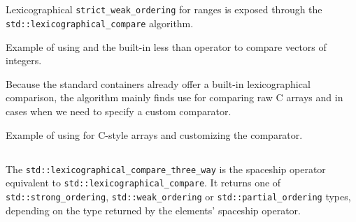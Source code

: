 \subsection{\texorpdfstring{}{\texttt{std::lexicographical\_compare}}}

Lexicographical \texttt{strict\_weak\_ordering} for ranges is exposed through the \texttt{std::lexicographical\_compare} algorithm.



\begin{box-note}
\footnotesize Example of using  and the built-in less than operator to compare vectors of integers.
\tcblower
{}
\end{box-note}

Because the standard containers already offer a built-in lexicographical comparison, the algorithm mainly finds use for comparing raw C arrays and in cases when we need to specify a custom comparator.

\begin{box-note}
\footnotesize Example of using  for C-style arrays and customizing the comparator.
\tcblower
{}
\end{box-note}

\subsection{\texorpdfstring{}{\texttt{std::lexicographical\_compare\_three\_way}}}

The \texttt{std::lexicographical\_compare\_three\_way} is the spaceship operator equivalent to \texttt{std::lexicographical\_compare}. It returns one of \texttt{std::strong\_ordering}, \texttt{std::weak\_ordering} or \texttt{std::partial\_ordering} types, depending on the type returned by the elements' spaceship operator.


